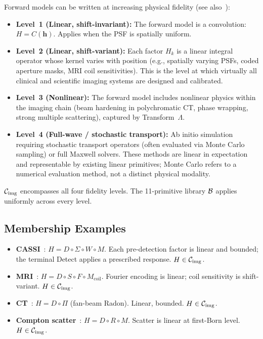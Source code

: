 \documentclass[11pt]{article}
\begin{document}
Forward models can be written at increasing physical fidelity (see also~\cite{yang2026pwm}):
\begin{itemize}
  \item \textbf{Level~1 (Linear, shift-invariant):} The forward model is a convolution: $H = C(\mathbf{h})$. Applies when the PSF is spatially uniform.
  \item \textbf{Level~2 (Linear, shift-variant):} Each factor $H_k$ is a linear integral operator whose kernel varies with position (e.g., spatially varying PSFs, coded aperture masks, MRI coil sensitivities). This is the level at which virtually all clinical and scientific imaging systems are designed and calibrated.
  \item \textbf{Level~3 (Nonlinear):} The forward model includes nonlinear physics within the imaging chain (beam hardening in polychromatic CT, phase wrapping, strong multiple scattering), captured by Transform~$\Lambda$.
  \item \textbf{Level~4 (Full-wave / stochastic transport):} Ab initio simulation requiring stochastic transport operators (often evaluated via Monte Carlo sampling) or full Maxwell solvers. These methods are linear in expectation and representable by existing linear primitives; Monte Carlo refers to a numerical evaluation method, not a distinct physical modality.
\end{itemize}
$\mathcal{C}_{\mathrm{img}}$ encompasses all four fidelity levels. The 11-primitive library $\mathcal{B}$ applies uniformly across every level.

\subsection{Membership Examples}

\begin{itemize}
  \item \textbf{CASSI}~\cite{wagadarikar2008cassi}: $H = D \circ \Sigma \circ W \circ M$. Each pre-detection factor is linear and bounded; the terminal Detect applies a prescribed response. $H \in \mathcal{C}_{\mathrm{img}}$.
  \item \textbf{MRI}~\cite{pruessmann1999sense}: $H = D \circ S \circ F \circ M_{\mathrm{coil}}$. Fourier encoding is linear; coil sensitivity is shift-variant. $H \in \mathcal{C}_{\mathrm{img}}$.
  \item \textbf{CT}~\cite{feldkamp1984practical,natterer2001radon}: $H = D \circ \Pi$ (fan-beam Radon). Linear, bounded. $H \in \mathcal{C}_{\mathrm{img}}$.
  \item \textbf{Compton scatter}~\cite{hussain2022compton}: $H = D \circ R \circ M$. Scatter is linear at first-Born level. $H \in \mathcal{C}_{\mathrm{img}}$.
\end{itemize}
\end{document}
